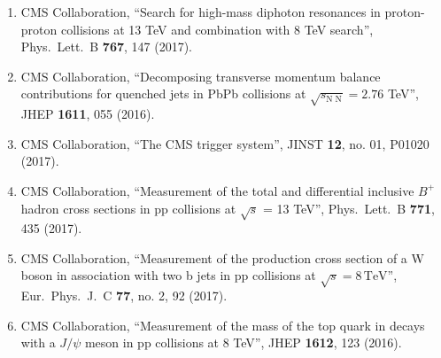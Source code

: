 \begin{enumerate}
\item CMS Collaboration, ``Search for high-mass diphoton resonances in proton-proton collisions at 13 TeV and combination with 8 TeV search'', Phys.\ Lett.\ B {\bf 767}, 147 (2017).

\item CMS Collaboration, ``Decomposing transverse momentum balance contributions for quenched jets in PbPb collisions at $ \sqrt{s_{\mathrm{N}\;\mathrm{N}}}=2.76 $ TeV'', JHEP {\bf 1611}, 055 (2016).

\item CMS Collaboration, ``The CMS trigger system'', JINST {\bf 12}, no. 01, P01020 (2017).

\item CMS Collaboration, ``Measurement of the total and differential inclusive $B^+$ hadron cross sections in pp collisions at $\sqrt{s}$ = 13 TeV'', Phys.\ Lett.\ B {\bf 771}, 435 (2017).

\item CMS Collaboration, ``Measurement of the production cross section of a W boson in association with two b jets in pp collisions at $\sqrt{s} = 8{\,\mathrm{{TeV}}} $'', Eur.\ Phys.\ J.\ C {\bf 77}, no. 2, 92 (2017).

\item CMS Collaboration, ``Measurement of the mass of the top quark in decays with a $J/\psi$ meson in pp collisions at 8 TeV'', JHEP {\bf 1612}, 123 (2016).


\end{enumerate}
